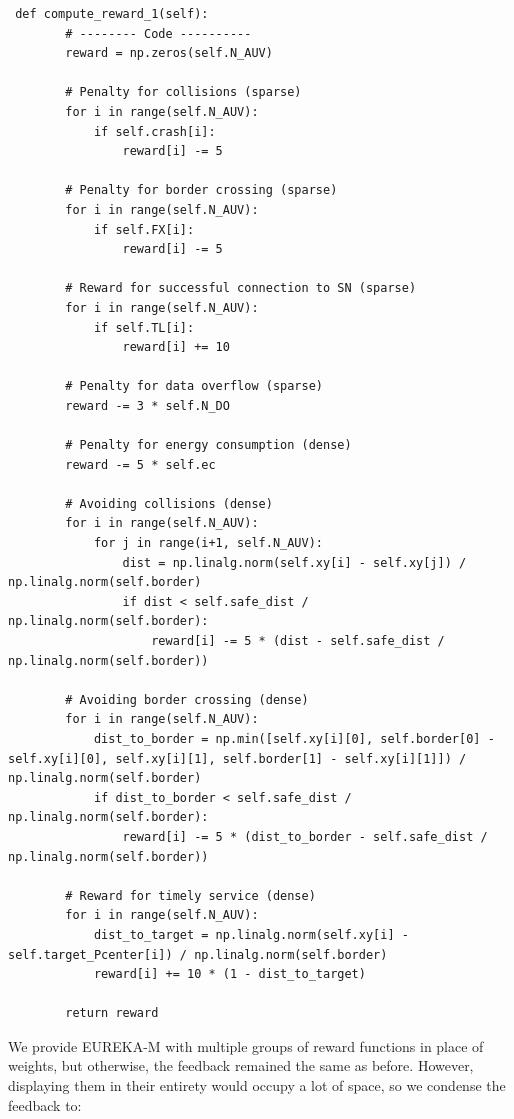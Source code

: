 \documentclass{article}
\begin{document}
\begin{verbatim}
 def compute_reward_1(self):
        # -------- Code ----------
        reward = np.zeros(self.N_AUV)
        
        # Penalty for collisions (sparse)
        for i in range(self.N_AUV):
            if self.crash[i]:
                reward[i] -= 5
        
        # Penalty for border crossing (sparse)
        for i in range(self.N_AUV):
            if self.FX[i]:
                reward[i] -= 5
        
        # Reward for successful connection to SN (sparse)
        for i in range(self.N_AUV):
            if self.TL[i]:
                reward[i] += 10
        
        # Penalty for data overflow (sparse)
        reward -= 3 * self.N_DO
        
        # Penalty for energy consumption (dense)
        reward -= 5 * self.ec
        
        # Avoiding collisions (dense)
        for i in range(self.N_AUV):
            for j in range(i+1, self.N_AUV):
                dist = np.linalg.norm(self.xy[i] - self.xy[j]) / np.linalg.norm(self.border)
                if dist < self.safe_dist / np.linalg.norm(self.border):
                    reward[i] -= 5 * (dist - self.safe_dist / np.linalg.norm(self.border))
        
        # Avoiding border crossing (dense)
        for i in range(self.N_AUV):
            dist_to_border = np.min([self.xy[i][0], self.border[0] - self.xy[i][0], self.xy[i][1], self.border[1] - self.xy[i][1]]) / np.linalg.norm(self.border)
            if dist_to_border < self.safe_dist / np.linalg.norm(self.border):
                reward[i] -= 5 * (dist_to_border - self.safe_dist / np.linalg.norm(self.border))
        
        # Reward for timely service (dense)
        for i in range(self.N_AUV):
            dist_to_target = np.linalg.norm(self.xy[i] - self.target_Pcenter[i]) / np.linalg.norm(self.border)
            reward[i] += 10 * (1 - dist_to_target)
        
        return reward
\end{verbatim}
We provide EUREKA-M with multiple groups of reward functions in place of weights, but otherwise, the feedback remained the same as before. However, displaying them in their entirety would occupy a lot of space, so we condense the feedback to:
\end{document}
